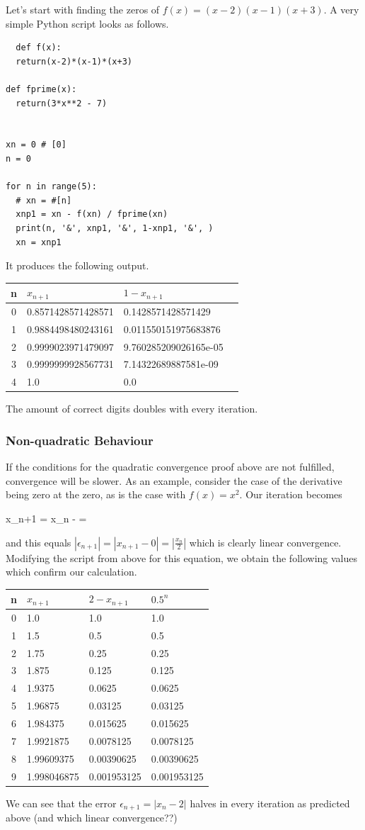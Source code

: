 Let's start with finding the zeros of $f(x) = (x-2)(x-1)(x+3)$. A very simple Python script looks as follows.

\begin{verbatim}
  def f(x):
  return(x-2)*(x-1)*(x+3)

def fprime(x):
  return(3*x**2 - 7)


xn = 0 # [0]
n = 0

for n in range(5):
  # xn = #[n]
  xnp1 = xn - f(xn) / fprime(xn)
  print(n, '&', xnp1, '&', 1-xnp1, '&', )
  xn = xnp1
\end{verbatim}

It produces the following output.

\begin{tabular}{c|lll} \hline
  n & $x_{n+1}$ &  $1 - x_{n+1}$ \\ \hline
  0 & 0.8571428571428571 & 0.1428571428571429 \\
  1 & 0.9884498480243161 & 0.011550151975683876 \\
  2 & 0.9999023971479097 & 9.760285209026165e-05 \\
  3 & 0.9999999928567731 & 7.14322689887581e-09 \\
  4 & 1.0 & 0.0
\end{tabular}

The amount of correct digits doubles with every iteration.

\subsubsection{Non-quadratic Behaviour}

If the conditions for the quadratic convergence proof above are not fulfilled, convergence will be slower. As an example, consider the case of the derivative being zero at the zero, as is the case with $f(x) = x^2$. Our iteration becomes

\bee
x_{n+1} = x_n -  = 
\eee

and this equals $|\epsilon_{n+1}| = |x_{n+1} - 0| = |\frac{x_n}{2}|$ which is clearly linear convergence. Modifying the script from above for this equation, we obtain the following values which confirm our calculation.

\begin{tabular}{c|lll} \hline
n & $x_{n+1}$ &  $2 - x_{n+1}$ & $0.5^n$ \\ \hline
0 & 1.0 & 1.0 & 1.0 \\
1 & 1.5 & 0.5 & 0.5 \\
2 & 1.75 & 0.25 & 0.25 \\
3 & 1.875 & 0.125 & 0.125 \\
4 & 1.9375 & 0.0625 & 0.0625 \\
5 & 1.96875 & 0.03125 & 0.03125 \\
6 & 1.984375 & 0.015625 & 0.015625 \\
7 & 1.9921875 & 0.0078125 & 0.0078125 \\
8 & 1.99609375 & 0.00390625 & 0.00390625 \\
9 & 1.998046875 & 0.001953125 & 0.001953125
\end{tabular}

We can see that the error $\epsilon_{n+1} = |x_n - 2|$ halves in every iteration as predicted above (and which linear convergence??)





